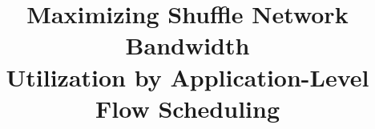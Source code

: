 \documentclass[10pt,journal,compsoc]{IEEEtran}
\begin{document}
%
\title{Maximizing Shuffle Network Bandwidth 
\\Utilization by Application-Level Flow Scheduling}
%
%
%
%

\end{document}
